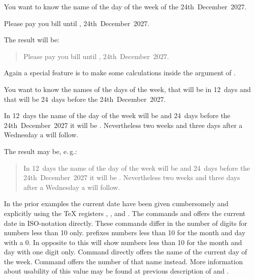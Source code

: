 \begin{Example}
  You want to know the name of the day of the week of the 24th~December~2027.
\begin{lstcode}
  Please pay you bill until ,
  24th~December~2027.
\end{lstcode}
  The result will be:
  \begin{quote}
    Please pay you bill until ,
    24th~December~2027.
  \end{quote}
\end{Example}

Again a special feature is to make some calculations inside the argument of
.
\begin{Example}
  You want to know the names of the days of the week, that will be in 12~days
  and that will be 24~days before the 24th~December~2027.
\begin{lstcode}
  In 12~days the name of the day of the week
  will be  and
  24~days before the 24th~December~2027 it will be
  . Nevertheless two weeks
  and three days after a Wednesday a
   will follow.
\end{lstcode}
  The result may be, e.\,g.:
  \begin{quote}
    In 12~days the name of the day of the week
    will be  and
    24~days before the 24th~December~2027 it will be
    . Nevertheless two weeks
    and three days after a Wednesday a
     will follow.
  \end{quote}
\end{Example}%
%
\EndIndexGroup


\begin{Declaration}
\end{Declaration}%
In the prior examples the current date have been given cumbersomely and
explicitly using the \TeX{} registers ,
, and . The commands
 and 
offers the current date in ISO-notation directly. These commands differ in the
number of digits for numbers less than 10 only.  prefixes
numbers less than 10 for the month and day with a 0. In opposite to this
 will show numbers less than 10 for the month and day with one
digit only. Command  directly offers the name of the current
day of the week. Command  offers the number of that name
instead. More information about usability of this value may be found at
previous description of  and .

